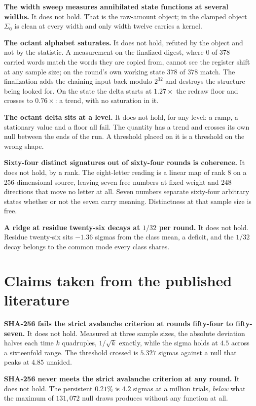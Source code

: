 \textbf{The width sweep measures annihilated state functions at several widths.} It does not hold. That is the raw-amount object; in the clamped object \(\Sigma_0\) is clean at every width and only width twelve carries a kernel.

\textbf{The octant alphabet saturates.} It does not hold, refuted by the object and not by the statistic. A measurement on the finalized digest, where \(0\) of \(378\) carried words match the words they are copied from, cannot see the register shift at any sample size; on the round's own working state \(378\) of \(378\) match. The finalization adds the chaining input back modulo \(2^{32}\) and destroys the structure being looked for. On the state the delta starts at \(1.27\times\) the redraw floor and crosses to \(0.76\times\): a trend, with no saturation in it.

\textbf{The octant delta sits at a level.} It does not hold, for any level: a ramp, a stationary value and a floor all fail. The quantity has a trend and crosses its own null between the ends of the run. A threshold placed on it is a threshold on the wrong shape.

\textbf{Sixty-four distinct signatures out of sixty-four rounds is coherence.} It does not hold, by a rank. The eight-letter reading is a linear map of rank \(8\) on a \(256\)-dimensional source, leaving seven free numbers at fixed weight and \(248\) directions that move no letter at all. Seven numbers separate sixty-four arbitrary states whether or not the seven carry meaning. Distinctness at that sample size is free.

\textbf{A ridge at residue twenty-six decays at \(1/32\) per round.} It does not hold. Residue twenty-six sits \(-1.36\) sigmas from the class mean, a deficit, and the \(1/32\) decay belongs to the common mode every class shares.

\section{Claims taken from the published literature}

\textbf{SHA-256 fails the strict avalanche criterion at rounds fifty-four to fifty-seven.} It does not hold. Measured at three sample sizes, the absolute deviation halves each time \(k\) quadruples, \(1/\sqrt{k}\) exactly, while the sigma holds at \(4.5\) across a sixteenfold range. The threshold crossed is \(5.327\) sigmas against a null that peaks at \(4.85\) unaided.

\textbf{SHA-256 never meets the strict avalanche criterion at any round.} It does not hold. The persistent \(0.21\%\) is \(4.2\) sigmas at a million trials, \emph{below} what the maximum of \(131{,}072\) null draws produces without any function at all.

